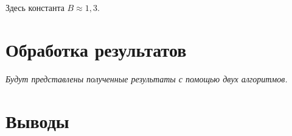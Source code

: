 \documentclass[magd,floatypics,numeref]{msudipl} %
\begin{document}
Здесь константа $B\approx1{,}3$.


\chapter{Обработка результатов}
\textit{Будут представлены полученные результаты с помощью двух алгоритмов. }
\chapter*{Выводы}   %


{}  %
\end{document}
